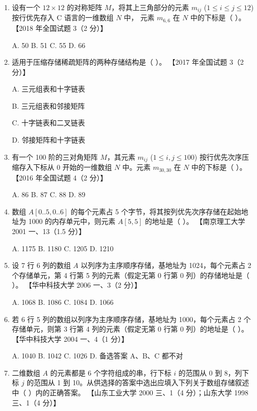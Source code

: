 \documentclass[lang=cn,newtx,10pt,scheme=chinese]{elegantbook}
\begin{document}
\begin{enumerate}
    \item 设有一个 $12 \times 12$ 的对称矩阵 $M$，将其上三角部分的元素 $m_{ij}$ ($1 \leq i \leq j \leq 12$) 按行优先存入 C 语言的一维数组 $N$ 中，
    元素 $m_{6,6}$ 在 $N$ 中的下标是（ ）。  
    【2018 年全国试题 3（2 分）】  

    A. 50 \quad B. 51 \quad C. 55 \quad D. 66  

    \item 适用于压缩存储稀疏矩阵的两种存储结构是（ ）。  
    【2017 年全国试题 3（2 分）】  

    A. 三元组表和十字链表  

    B. 三元组表和邻接矩阵  

    C. 十字链表和二叉链表 

    D. 邻接矩阵和十字链表  

    \item 有一个 100 阶的三对角矩阵 $M$，其元素 $m_{ij}$ ($1 \leq i, j \leq 100$) 按行优先次序压缩存入下标从 0 开始的一维数组 $N$ 中。元素 $m_{30,30}$ 在 $N$ 中的下标是（ ）。  
    【2016 年全国试题 4（2 分）】  

    A. 86 \quad B. 87 \quad C. 88 \quad D. 89  

    \item 数组 $A[0..5, 0..6]$ 的每个元素占 5 个字节，将其按列优先次序存储在起始地址为 1000 的内存单元中，则元素 $A[5,5]$ 的地址是（ ）。  
    【南京理工大学 2001 一、13（1.5 分）】 

    A. 1175 \quad B. 1180 \quad C. 1205 \quad D. 1210  

    \item 设 7 行 6 列的数组 $A$ 以列序为主序顺序存储，基地址为 1024，每个元素占 2 个存储单元，第 4 行第 5 列的元素（假定无第 0 行第 0 列）的存储地址是（ ）。  
    【华中科技大学 2006 一、3（2 分）】 

    A. 1068 \quad B. 1086 \quad C. 1084 \quad D. 1066  

    \item 若 6 行 5 列的数组以列序为主序顺序存储，基地址为 1000，每个元素占 2 个存储单元，则第 3 行第 4 列的元素（假定无第 0 行第 0 列）的地址是（ ）。  
    【华中科技大学 2004 一、4（1 分）】 

    A. 1040 \quad B. 1042 \quad C. 1026 \quad D. 备选答案 A、B、C 都不对  

    \item 二维数组 $A$ 的元素都是 6 个字符组成的串，行下标 $i$ 的范围从 0 到 8，列下标 $j$ 的范围从 1 到 10。从供选择的答案中选出应填入下列关于数组存储叙述中（ ）内的正确答案。  
    【山东工业大学 2000 三、1（4 分）；山东大学 1998 三、1（4 分）】  


\end{enumerate}
\end{document}
